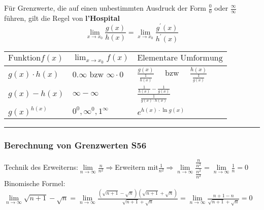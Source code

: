 			\begin{minipage}{.5\columnwidth}
				Für Grenzwerte, die auf einen unbestimmten Ausdruck der Form $\frac{0}{0}$ oder
				$\frac{\infty}{\infty}$ führen, gilt die Regel von \textbf{l'Hospital}
				\begin{equation*}
				\lim _{x \rightarrow x_{0}} \frac{g(x)}{h(x)}=\lim _{x \rightarrow x_{0}} \frac{g^{\prime}(x)}{h^{\prime}(x)}
				\end{equation*}
			\end{minipage}
			\hspace{2mm}
			\vline
			\hspace{2mm}
			\begin{minipage}{.5\columnwidth}
				\begin{tabulary}{1\textwidth}{L|L|L}
				 $\text{Funktion} f(x)$	  & $\lim _{x \rightarrow x_{0}} f(x)$       & $\text{Elementare Umformung}$                                                        \\ \hline
				 $g(x) \cdot h(x)$      & $0 . \infty \text{ bzw } \infty \cdot 0$ & $\frac{g(x)}{\frac{1}{h(x)}} \quad \text{ bzw } \quad \frac{h(x)}{\frac{1}{g(x)}}$ \\ \hline
				 $g(x)-h(x)$            & $\infty-\infty $                           & $\frac{\frac{1}{h(x)}-\frac{1}{g(x)}}{\frac{1}{g(x) \cdot h(x)}}$                    \\ \hline
				 $g(x)^{h(x)}$          & $0^{0}, \infty^{0}, 1^{\infty}$            & $e^{h(x) \cdot \ln g(x)}$                                                       
				\end{tabulary}
			\end{minipage}

				
		
		
	
		\hrule
		
		
		\subsubsection{Berechnung von Grenzwerten \color{red}S56} 
		Technik des Erweiterns:$\lim\limits_{n\to \infty} \frac{n}{n^{2}}\Rightarrow $Erweitern mit$\frac{1}{n^{2}} \Rightarrow \lim\limits_{n\to \infty} \dfrac{\frac{n}{n^{2}}}{\frac{n^{2}}{n^{2}}} =\lim\limits_{n\to \infty}\frac{1}{n}=0$\\
		Binomische Formel: $ \lim\limits_{n\to \infty}\sqrt{n+1}-\sqrt{n}= \lim\limits_{n\to \infty}\frac{(\sqrt{n+1}-\sqrt{n})(\sqrt{n+1}+\sqrt{n})}{\sqrt{n+1}+\sqrt{n}}=  
		\lim\limits_{n\to \infty}\frac{n+1-n}{\sqrt{n+1}+\sqrt{n}}= 0$
		

